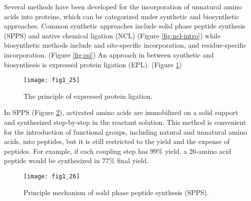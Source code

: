 \begin{refsection}
Several methods have been developed for the incorporation of unnatural amino
acids into proteins, which can be categorized under synthetic and biosynthetic
approaches. Common synthetic approaches include solid phase peptide synthesis
(SPPS) and native chemical ligation (NCL) (Figure
\ref{fig:ncl-intro}) while biosynthetic methods include  and
 site-specific incorporation\cite{Cellitti2008,Hassan2008}, and
residue-specific incorporation\cite{Johnson2010}. (Figure \ref{fig:rsi}) An
approach in between synthetic and biosynthesis is expressed protein ligation
(EPL)\cite{Muir1998}. (Figure \ref{fig:epl-intro})
\begin{figure}[h!] \centering \texttt{[image: fig1\_25]}
    \caption[The principle of expressed protein ligation.]{The principle of
        expressed protein ligation\cite{Muir1998}.} 
        \label{fig:epl-intro} 
\end{figure}

In SPPS  (Figure \ref{fig:spps-intro}), activated amino acids are
immobilized on a solid support and synthesized step-by-step in the reactant
solution. This method is convenient for the introduction of functional groups,
including natural and unnatural amino acids, into peptides, but it is still
restricted to the yield and the expense of peptides. For example, if each
coupling step has 99\% yield, a 26-amino acid peptide would be synthesized in
77\% final yield\cite{Chan2000}.  
\begin{figure}[h!] \centering \texttt{[image: fig1\_26]}
    \caption[Princilple mechanism of soild phase peptide synthesis
    (SPPS).]{Principle mechanism of soild phase peptide synthesis
        (SPPS)\cite{Merrifield1963a}.} \label{fig:spps-intro} 
\end{figure}


\end{refsection}
